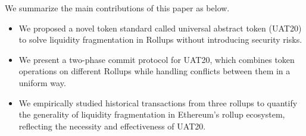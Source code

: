 We summarize the main contributions of this paper as below.

\begin{itemize}[leftmargin=*]



\item We proposed a novel token standard called universal abstract token (UAT20) to solve liquidity fragmentation in Rollups without introducing security risks.


\item We present a two-phase commit protocol for UAT20, which combines token operations on different Rollups while handling conflicts between them in a uniform way.

\item We empirically studied historical transactions from three rollups to quantify the generality of liquidity fragmentation in Ethereum's rollup ecosystem, reflecting the necessity and effectiveness of UAT20.




    

\end{itemize}
